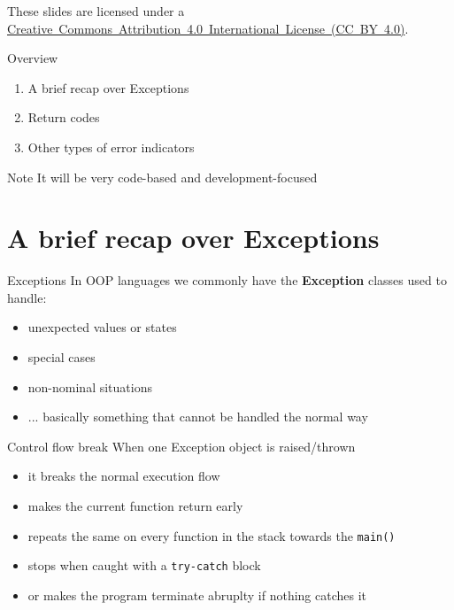 \documentclass[aspectratio=169,14pt]{beamer}
\begin{document}
\begin{frame}
\titlepage

\begin{center}
    \begin{footnotesize}
    These slides are licensed under a \href{https://creativecommons.org/licenses/by/4.0/}{Creative~Commons~Attribution~4.0~International~License~(CC~BY~4.0)}.
    \end{footnotesize}
\end{center}
\end{frame}


\begin{frame}{Overview}
\begin{enumerate}
    \item A brief recap over Exceptions
    \item Return codes
    \item Other types of error indicators
\end{enumerate}

\begin{block}{Note}
It will be very code-based and development-focused
\end{block}
\end{frame}


\section{A brief recap over Exceptions}

\begin{frame}{Exceptions}
In OOP languages we commonly have the \textbf{Exception} classes used to handle:
\begin{itemize}
    \item unexpected values or states
    \item special cases
    \item non-nominal situations
    \item ... basically something that cannot be handled the normal way
\end{itemize}
\end{frame}


\begin{frame}{Control flow break}
When one Exception object is raised/thrown
\begin{itemize}
    \item it breaks the normal execution flow
    \item makes the current function return early
    \item repeats the same on every function in the stack towards the \texttt{main()}
    \item stops when caught with a \texttt{try-catch} block
    \item or makes the program terminate abruplty if nothing catches it
\end{itemize}
\end{frame}
\end{document}
